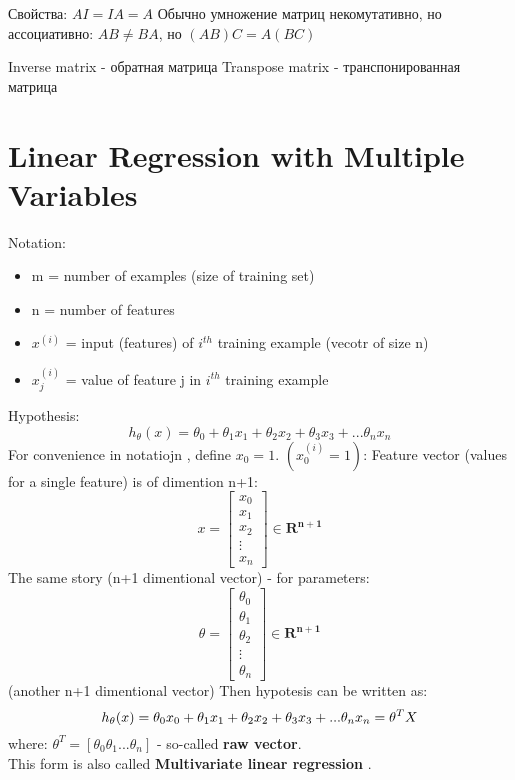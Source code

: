 \documentclass{scrartcl}
\begin{document}
Свойства: $A I = I A = A$
Обычно умножение матриц некомутативно, но ассоциативно: $A B \neq B
A$, но $(A B) C = A (B C)$

Inverse matrix - обратная матрица
Transpose matrix - транспонированная матрица

\section {Linear Regression with Multiple Variables}
Notation: \\
\begin{itemize}
\item {m} = number of examples (size of training set)
\item {n} = number of features
\item{$x^{(i)}$} = input (features) of $i^{th}$ training example
  (vecotr of size n)
\item {$x_j^{(i)}$} = value of feature j in $i^{th}$ training example
\end{itemize}
Hypothesis: \\
\[
h_\theta(x) = \theta_0 + \theta_1x_1 + \theta_2x_2 + \theta_3x_3 + ... \theta_nx_n
\]
For convenience in notatiojn , define $x_0=1$. $(x_0^{(i)}=1)$:
Feature vector (values for a single feature) is of dimention n+1:
\[
x = \left[ \begin{array}{c} x_0 \\ x_1 \\ x_2 \\ \vdots \\ x_n
  \end{array} \right] \in \mathbf{R^{n+1}}
\]
The same story (n+1 dimentional vector) - for parameters:
\[
\theta = \left[ \begin{array}{c} \theta_0 \\ \theta_1 \\ \theta_2 \\ \vdots \\ \theta_n
  \end{array} \right] \in \mathbf{R^{n+1}}
\]
(another n+1 dimentional vector)
Then hypotesis can be written as: 
\[
h_\theta(x) = \theta_0x_0 + \theta_1x_1 + \theta_2x_2 + \theta_3x_3 +
... \theta_nx_n = \\ \theta^TX
\]
where: $\theta^T = [\theta_0 \theta_1 ... \theta_n]$ - so-called {\bf
  raw vector}. \\

This form is also called {\bf Multivariate linear regression }.
\end{document}
